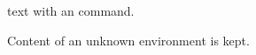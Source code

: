 \documentclass{article}
\begin{document}
 text with an \undefinedthing{} command.
\begin{unknownenv}
Content of an unknown environment is kept.
\end{unknownenv}
\end{document}
